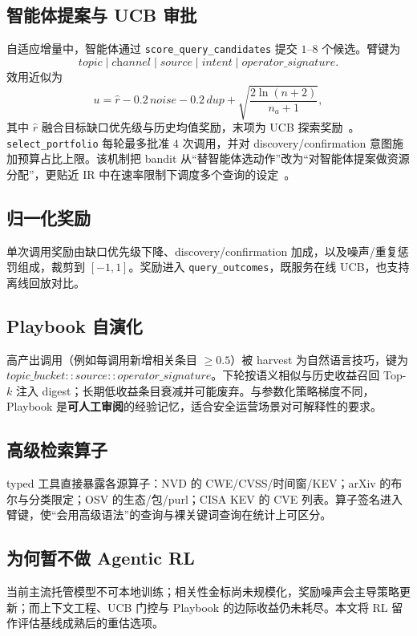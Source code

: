 \documentclass[conference]{IEEEtran}
\newcommand{\code}[1]{\texttt{\small #1}}
\begin{document}
\subsection{智能体提案与 UCB 审批}
自适应增量中，智能体通过 \code{score\_query\_candidates} 提交 $1$--$8$ 个候选。臂键为
\[
\textit{topic}\mid\textit{channel}\mid\textit{source}\mid\textit{intent}\mid\textit{operator\_signature}.
\]
效用近似为
\[
u = \widehat{r} - 0.2\,\textit{noise} - 0.2\,\textit{dup} + \sqrt{\frac{2\ln(n+2)}{n_a+1}},
\]
其中 $\widehat{r}$ 融合目标缺口优先级与历史均值奖励，末项为 UCB 探索奖励~\cite{auer2002ucb}。\code{select\_portfolio} 每轮最多批准 4 次调用，并对 discovery/confirmation 意图施加预算占比上限。该机制把 bandit 从“替智能体选动作”改为“对智能体提案做资源分配”，更贴近 IR 中在速率限制下调度多个查询的设定~\cite{li2016multiple,losada2021cost}。

\subsection{归一化奖励}
单次调用奖励由缺口优先级下降、discovery/confirmation 加成，以及噪声/重复惩罚组成，裁剪到 $[-1,1]$。奖励进入 \code{query\_outcomes}，既服务在线 UCB，也支持离线回放对比。

\subsection{Playbook 自演化}
高产出调用（例如每调用新增相关条目 $\ge 0.5$）被 harvest 为自然语言技巧，键为 $\textit{topic\_bucket}::\textit{source}::\textit{operator\_signature}$。下轮按语义相似与历史收益召回 Top-$k$ 注入 digest；长期低收益条目衰减并可能废弃。与参数化策略梯度不同，Playbook 是\textbf{可人工审阅}的经验记忆，适合安全运营场景对可解释性的要求。

\subsection{高级检索算子}
typed 工具直接暴露各源算子：NVD 的 CWE/CVSS/时间窗/KEV；arXiv 的布尔与分类限定；OSV 的生态/包/purl；CISA KEV 的 CVE 列表。算子签名进入臂键，使“会用高级语法”的查询与裸关键词查询在统计上可区分。

\subsection{为何暂不做 Agentic RL}
当前主流托管模型不可本地训练；相关性金标尚未规模化，奖励噪声会主导策略更新；而上下文工程、UCB 门控与 Playbook 的边际收益仍未耗尽。本文将 RL 留作评估基线成熟后的重估选项。
\end{document}
